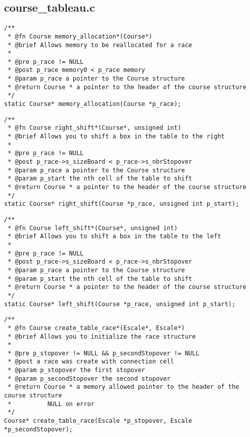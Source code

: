 \documentclass[a4paper, 11pt, oneside]{article}
\begin{document}
	\subsection{course\_tableau.c}

		\begin{lstlisting}
/**
 * @fn Course memory_allocation*(Course*)
 * @brief Allows memory to be reallocated for a race
 *
 * @pre p_race != NULL
 * @post p_race memory0 < p_race memory
 * @param p_race a pointer to the Course structure
 * @return Course * a pointer to the header of the course structure
 */
static Course* memory_allocation(Course *p_race);
		\end{lstlisting}

		\begin{lstlisting}
/**
 * @fn Course right_shift*(Course*, unsigned int)
 * @brief Allows you to shift a box in the table to the right
 *
 * @pre p_race != NULL
 * @post p_race->s_sizeBoard < p_race->s_nbrStopover
 * @param p_race a pointer to the Course structure
 * @param p_start the nth cell of the table to shift
 * @return Course * a pointer to the header of the course structure
 */
static Course* right_shift(Course *p_race, unsigned int p_start);
		\end{lstlisting}

		\begin{lstlisting}
/**
 * @fn Course left_shift*(Course*, unsigned int)
 * @brief Allows you to shift a box in the table to the left
 *
 * @pre p_race != NULL
 * @post p_race->s_sizeBoard < p_race->s_nbrStopover
 * @param p_race a pointer to the Course structure
 * @param p_start the nth cell of the table to shift
 * @return Course * a pointer to the header of the course structure
 */
static Course* left_shift(Course *p_race, unsigned int p_start);
		\end{lstlisting}

		\begin{lstlisting}
/**
 * @fn Course create_table_race*(Escale*, Escale*)
 * @brief Allows you to initialize the race structure
 *
 * @pre p_stopover != NULL && p_secondStopover != NULL
 * @post a race was create with connection cell
 * @param p_stopover the first stopover
 * @param p_secondStopover the second stopover
 * @return Course * a memory allowed pointer to the header of the course structure
 * 			NULL on error
 */
Course* create_table_race(Escale *p_stopover, Escale *p_secondStopover);
		\end{lstlisting}
\end{document}
